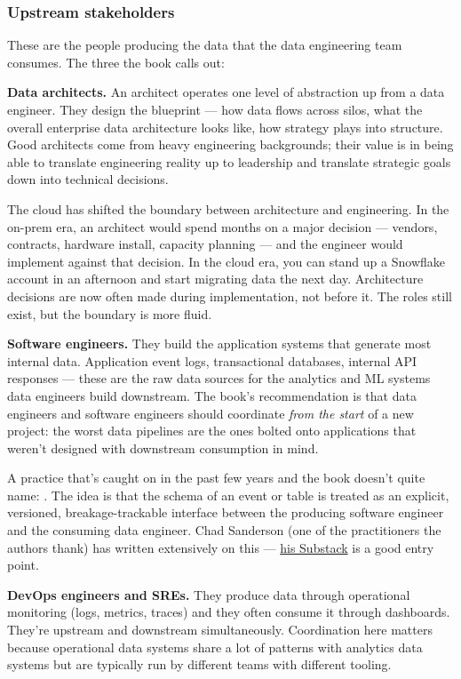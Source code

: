\subsubsection{Upstream stakeholders}

These are the people producing the data that the data engineering team consumes. The three the book calls out:

\textbf{Data architects.} An architect operates one level of abstraction up from a data engineer. They design the blueprint — how data flows across silos, what the overall enterprise data architecture looks like, how strategy plays into structure. Good architects come from heavy engineering backgrounds; their value is in being able to translate engineering reality up to leadership and translate strategic goals down into technical decisions.

The cloud has shifted the boundary between architecture and engineering. In the on-prem era, an architect would spend months on a major decision — vendors, contracts, hardware install, capacity planning — and the engineer would implement against that decision. In the cloud era, you can stand up a Snowflake account in an afternoon and start migrating data the next day. Architecture decisions are now often made during implementation, not before it. The roles still exist, but the boundary is more fluid.

\textbf{Software engineers.} They build the application systems that generate most internal data. Application event logs, transactional databases, internal API responses — these are the raw data sources for the analytics and ML systems data engineers build downstream. The book's recommendation is that data engineers and software engineers should coordinate \emph{from the start} of a new project: the worst data pipelines are the ones bolted onto applications that weren't designed with downstream consumption in mind.

A practice that's caught on in the past few years and the book doesn't quite name: . The idea is that the schema of an event or table is treated as an explicit, versioned, breakage-trackable interface between the producing software engineer and the consuming data engineer. Chad Sanderson (one of the practitioners the authors thank) has written extensively on this — \href{https://dataproducts.substack.com/}{his Substack} is a good entry point.

\textbf{DevOps engineers and SREs.} They produce data through operational monitoring (logs, metrics, traces) and they often consume it through dashboards. They're upstream and downstream simultaneously. Coordination here matters because operational data systems share a lot of patterns with analytics data systems but are typically run by different teams with different tooling.

